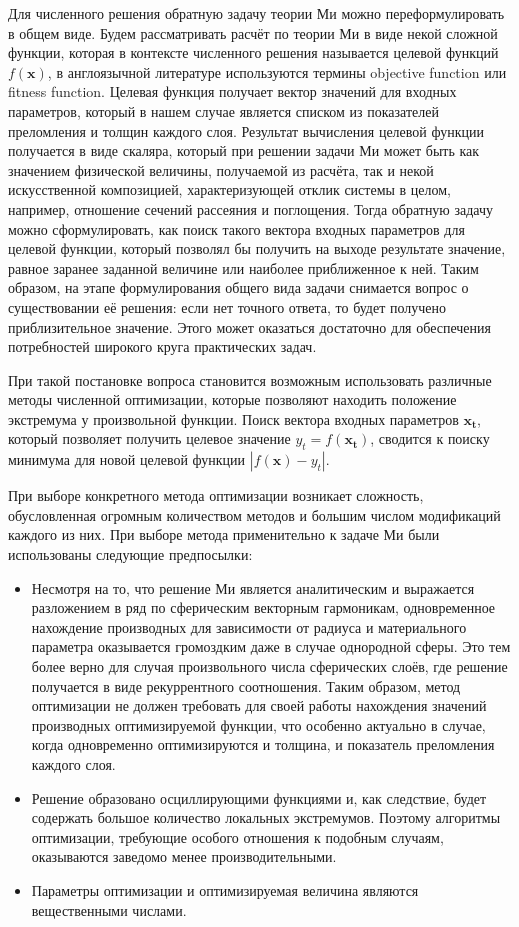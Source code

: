 Для численного решения обратную задачу теории Ми можно
переформулировать в общем виде. Будем рассматривать расчёт по теории
Ми в виде некой сложной функции, которая в контексте численного
решения называется целевой функций $f(\mathbf{x})$, в англоязычной
литературе используются термины objective function или fitness
function.  Целевая функция получает вектор значений для входных
параметров, который в нашем случае является списком из показателей
преломления и толщин каждого слоя. Результат вычисления целевой
функции получается в виде скаляра, который при решении задачи Ми может
быть как значением физической величины, получаемой из расчёта,
так и некой искусственной композицией, характеризующей отклик системы в
целом, например, отношение сечений рассеяния и поглощения. Тогда
обратную задачу можно сформулировать, как поиск такого вектора входных
параметров для целевой функции, который позволял бы получить на выходе
результате значение, равное заранее заданной величине или наиболее
приближенное к ней. Таким образом, на этапе формулирования общего вида
задачи снимается вопрос о существовании её решения: если нет точного ответа, то будет получено приблизительное значение. Этого может оказаться достаточно для обеспечения потребностей
широкого круга практических задач.

При такой постановке вопроса становится возможным использовать
различные методы численной оптимизации, которые позволяют находить
положение экстремума у произвольной функции. Поиск вектора входных
параметров $\mathbf{x_t}$, который позволяет получить целевое значение
$y_t=f(\mathbf{x_t})$, сводится к поиску минимума для новой целевой
функции $\left|f(\mathbf{x})-y_t\right|$.

При выборе конкретного метода оптимизации возникает сложность,
обусловленная огромным количеством методов и большим числом
модификаций каждого из них. При выборе метода применительно к задаче
Ми были использованы следующие предпосылки:
\begin{itemize}
\item Несмотря на то, что решение Ми является аналитическим и
  выражается разложением в ряд по сферическим векторным
  гармоникам, одновременное нахождение производных для зависимости от
  радиуса и материального параметра оказывается громоздким даже в
  случае однородной сферы. Это тем более верно для случая
  произвольного числа сферических слоёв, где решение получается в виде
  рекуррентного соотношения.  Таким образом, метод оптимизации не
  должен требовать для своей работы нахождения значений производных
  оптимизируемой функции, что особенно актуально в случае, когда
  одновременно оптимизируются и толщина, и показатель преломления
  каждого слоя.
\item Решение образовано осциллирующими функциями и, как следствие,
  будет содержать большое количество локальных экстремумов. Поэтому
  алгоритмы оптимизации, требующие особого отношения к подобным
  случаям, оказываются заведомо менее производительными.
\item Параметры оптимизации и оптимизируемая величина являются
  вещественными числами.
\end{itemize}

